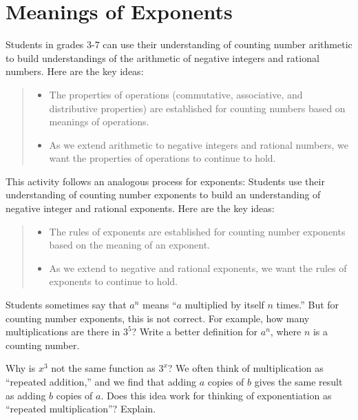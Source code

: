 \newpage
\section{Meanings of Exponents}\label{A:MeaningsOfExponents}

Students in grades 3-7 can use their understanding of counting number arithmetic to build understandings of the arithmetic of negative integers and rational numbers.  Here are the key ideas: 
\begin{quote}
\begin{itemize}
\item The properties of operations (commutative, associative, and distributive properties) are established for counting numbers based on meanings of operations. 
\item As we extend arithmetic to negative integers and rational numbers, we want the properties of operations to continue to hold.  
\end{itemize}
\end{quote}

This activity follows an analogous process for exponents: Students use their understanding of counting number exponents to build an understanding of negative integer and rational exponents.  Here are the key ideas: 
\begin{quote}
\begin{itemize}
\item The rules of exponents are established for counting number exponents based on the meaning of an exponent.  
\item As we extend to negative and rational exponents, we want the rules of exponents to continue to hold.  
\end{itemize}
\end{quote}

\begin{prob}
Students sometimes say that $a^n$ means ``$a$ multiplied by itself $n$ times.''  But for counting number exponents, this is not correct.  For example, how many multiplications are there in $3^5$?  Write a better definition for $a^n$, where $n$ is a counting number.  
\end{prob}

\begin{prob}
Why is $x^3$ not the same function as $3^x$?  We often think of multiplication as ``repeated addition,'' and we find that adding $a$ copies of $b$ gives the same result as adding $b$ copies of $a$.  Does this idea work for thinking of exponentiation as ``repeated multiplication''?  Explain.  
\end{prob}

